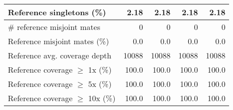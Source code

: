 \documentclass[12pt,a4paper]{article}
\begin{document}
\begin{table}[ht]
\begin{center}
\begin{tabular}{|l*{4}{|r}|}
Reference singletons (\%) & 2.18 & 2.18 & 2.18 & 2.18 \\ \hline
\# reference misjoint mates & 0 & 0 & 0 & 0 \\ \hline
Reference misjoint mates (\%) & 0.0 & 0.0 & 0.0 & 0.0 \\ \hline
Reference avg. coverage depth & 10088 & 10088 & 10088 & 10088 \\ \hline
Reference coverage $\geq$ 1x (\%) & 100.0 & 100.0 & 100.0 & 100.0 \\ \hline
Reference coverage $\geq$ 5x (\%) & 100.0 & 100.0 & 100.0 & 100.0 \\ \hline
Reference coverage $\geq$ 10x (\%) & 100.0 & 100.0 & 100.0 & 100.0 \\ \hline
\end{tabular}
\end{center}
\end{table}
\end{document}
